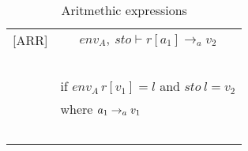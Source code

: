 \begin{table}
\begin{tabular}{l l}
[ARR] & \[env_A, \: sto \vdash r[a_{1}] \rightarrow_a v_2\] \\
~ & ~ \\
~ & \indent\indent if $env_A \, r[v_{1}]=l$ and $sto \: l=v_2$ \\
~ & \indent\indent where $a_1 \rightarrow_a v_1$ \\
~ & ~ \\

\end{tabular}
\caption{Aritmethic expressions}
\end{table}

